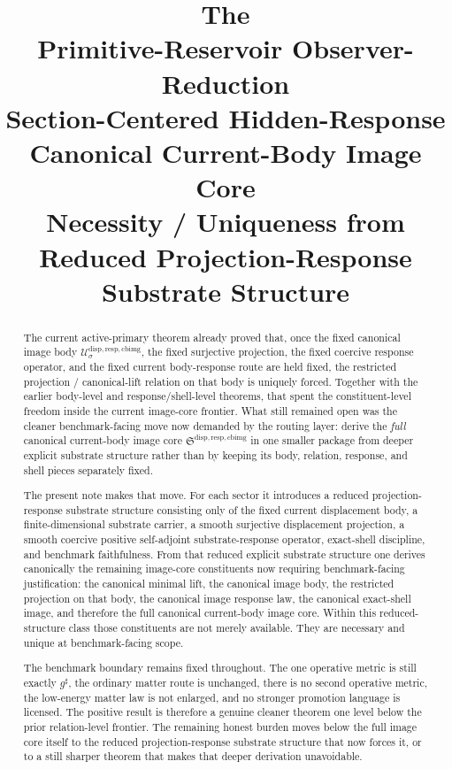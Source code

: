 \documentclass[11pt]{article}
\title{\textbf{The \TheoryName{}}\\[0.4em]
\large Primitive-Reservoir Observer-Reduction\\
\large Section-Centered Hidden-Response\\
\large Canonical Current-Body Image Core\\
\large Necessity / Uniqueness from\\
\large Reduced Projection-Response Substrate Structure}
\author{}
\date{}
\newcommand{\CompletedMetric}{g^{\sharp}}
\newcommand{\CurrentBodyImageCore}{\mathfrak S^{\mathrm{disp,resp,cbimg}}}
\newcommand{\CanonicalImageBody}[1]{\mathcal U_{#1}^{\mathrm{disp,resp,cbimg}}}
\begin{document}
\maketitle

\begin{abstract}
The current active-primary theorem already proved that, once the fixed canonical image body \(\CanonicalImageBody{\sigma}\), the fixed surjective projection, the fixed coercive response operator, and the fixed current body-response route are held fixed, the restricted projection / canonical-lift relation on that body is uniquely forced. Together with the earlier body-level and response/shell-level theorems, that spent the constituent-level freedom inside the current image-core frontier. What still remained open was the cleaner benchmark-facing move now demanded by the routing layer: derive the \emph{full} canonical current-body image core \(\CurrentBodyImageCore\) in one smaller package from deeper explicit substrate structure rather than by keeping its body, relation, response, and shell pieces separately fixed.

The present note makes that move. For each sector it introduces a reduced projection-response substrate structure consisting only of the fixed current displacement body, a finite-dimensional substrate carrier, a smooth surjective displacement projection, a smooth coercive positive self-adjoint substrate-response operator, exact-shell discipline, and benchmark faithfulness. From that reduced explicit substrate structure one derives canonically the remaining image-core constituents now requiring benchmark-facing justification: the canonical minimal lift, the canonical image body, the restricted projection on that body, the canonical image response law, the canonical exact-shell image, and therefore the full canonical current-body image core. Within this reduced-structure class those constituents are not merely available. They are necessary and unique at benchmark-facing scope.

The benchmark boundary remains fixed throughout. The one operative metric is still exactly \(\CompletedMetric\), the ordinary matter route is unchanged, there is no second operative metric, the low-energy matter law is not enlarged, and no stronger promotion language is licensed. The positive result is therefore a genuine cleaner theorem one level below the prior relation-level frontier. The remaining honest burden moves below the full image core itself to the reduced projection-response substrate structure that now forces it, or to a still sharper theorem that makes that deeper derivation unavoidable.
\end{abstract}
\end{document}
